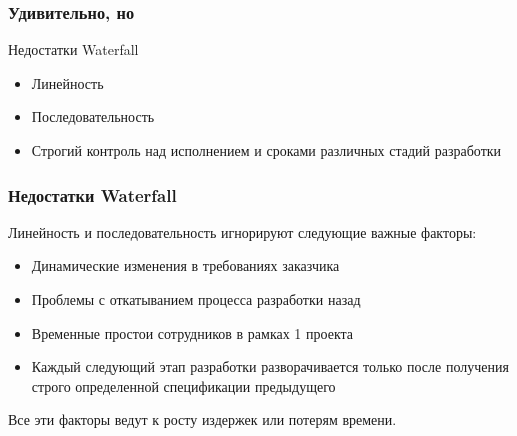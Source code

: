 \documentclass{../industrial-development}
\begin{document}
\begin{frame} \frametitle{Удивительно, но}
\begin {block}{Недостатки Waterfall}
  \begin{itemize}
  \item Линейность 
  \item Последовательность 
	\item Строгий контроль над исполнением и сроками различных стадий разработки
  \end{itemize}
\end {block}
\end{frame}

\begin{frame} \frametitle{Недостатки Waterfall}
Линейность и последовательность игнорируют следующие важные факторы:
  \begin{itemize}
  \item Динамические изменения в требованиях заказчика
  \item Проблемы с откатыванием процесса разработки назад
	\item Временные простои сотрудников в рамках 1 проекта
	\item Каждый следующий этап разработки разворачивается только после получения строго определенной спецификации предыдущего
	 \end{itemize}
\begin {block}{}Все эти факторы ведут к \alert {росту издержек} или \alert{потерям времени}.\end {block}
\end{frame}
\end{document}
